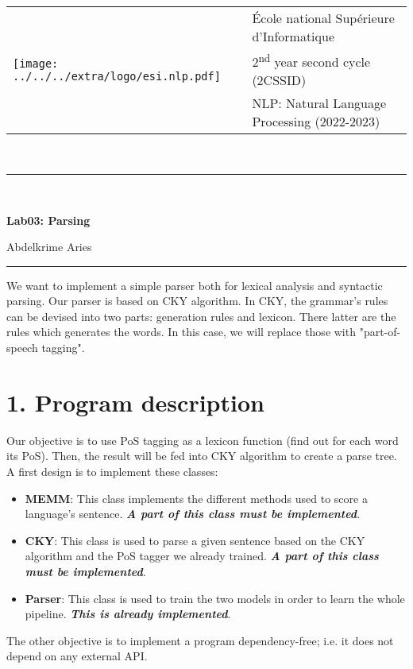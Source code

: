 \documentclass[11pt, a4paper]{article}
\begin{document}

\noindent
\begin{tabular}{ll}
\multirow{3}{*}{\texttt{[image: ../../../extra/logo/esi.nlp.pdf]}} & \'Ecole national Supérieure d'Informatique\\
& 2\textsuperscript{nd} year second cycle (2CSSID)\\
& NLP: Natural Language Processing (2022-2023)
\end{tabular}\\[.25cm]
\noindent\rule{\textwidth}{2pt}\\[-0.5cm]
\begin{center}
{\LARGE \textbf{Lab03: Parsing}}
\begin{flushright}
	Abdelkrime Aries
\end{flushright}
\end{center}\vspace{-0.5cm}
\noindent\rule{\textwidth}{2pt}

We want to implement a simple parser both for lexical analysis and syntactic parsing. 
Our parser is based on CKY algorithm.
In CKY, the grammar's rules can be devised into two parts: generation rules and lexicon.
There latter are the rules which generates the words.
In this case, we will replace those with "part-of-speech tagging".

\section*{1. Program description}

Our objective is to use PoS tagging as a lexicon function (find out for each word its PoS).
Then, the result will be fed into CKY algorithm to create a parse tree.
A first design is to implement these classes:
\begin{itemize}
	\item \textbf{MEMM}: This class implements the different methods used to score a language's sentence.
	\textbf{\slshape A part of this class must be implemented}.
	\item \textbf{CKY}: This class is used to parse a given sentence based on the CKY algorithm and the PoS tagger we already trained.
	\textbf{\slshape A part of this class must be implemented}.
	\item \textbf{Parser}: This class is used to train the two models in order to learn the whole pipeline.
	\textbf{\slshape This is already implemented}.
\end{itemize}
The other objective is to implement a program dependency-free; i.e. it does not depend on any external API.
\end{document}
